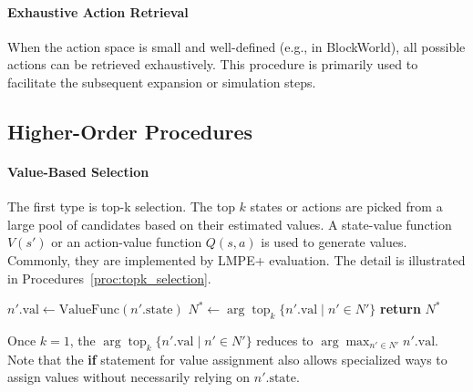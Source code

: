 \paragraph{Exhaustive Action Retrieval}  
When the action space is small and well-defined (e.g., in BlockWorld), all possible actions can be retrieved exhaustively. This procedure is primarily used to facilitate the subsequent expansion or simulation steps.

\subsection{Higher-Order Procedures}
\paragraph{Value-Based Selection} %
The first type is top-k selection.
The top $k$ states or actions are picked from a large pool of candidates based on their estimated values. A state-value function $V(s')$ or an action-value function $Q(s,a)$ is used to generate values. Commonly, they are implemented by LMPE+ evaluation. The detail is illustrated in Procedures~\ref{proc:topk_selection}. 
\begin{procedure}[h!]
\caption{Value-Based TopK Selection}
\label{proc:topk_selection}
\small 
\begin{algorithmic}[1]
                \State $n'.\text{val} \gets \text{ValueFunc}(n'.\text{state})$
            \EndIf
        \EndFor
        \State $N^* \leftarrow   \arg\operatorname{top}_k\bigl\{n'.\text{val}  \mid n' \in N'\bigr\}$
        \State \textbf{return} $N^*$
    \EndProcedure
\end{algorithmic}
\end{procedure}

Once $k=1$, the $\arg\operatorname{top}_k\bigl\{n'.\text{val}  \mid n' \in N'\bigr\}$ reduces to
$\arg\max_{n' \in N'} n'.\text{val}.$ 
Note that the \textbf{if} statement for value assignment also allows specialized ways to assign values without necessarily relying on \(n'.\text{state}\). 

